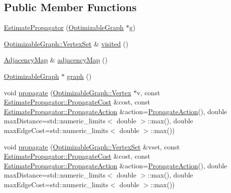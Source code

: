 \subsection*{Public Member Functions}
\begin{DoxyCompactItemize}
\item 
\hyperlink{classg2o_1_1EstimatePropagator_af245037ba41bfb02d531c11f5de4f7e8}{Estimate\+Propagator} (\hyperlink{structg2o_1_1OptimizableGraph}{Optimizable\+Graph} $\ast$g)
\item 
\hyperlink{classg2o_1_1HyperGraph_a703938cdb4bb636860eed55a2489d70c}{Optimizable\+Graph\+::\+Vertex\+Set} \& \hyperlink{classg2o_1_1EstimatePropagator_a2d346a2411d969caa81817c15052cd58}{visited} ()
\item 
\hyperlink{classg2o_1_1EstimatePropagator_aa450038ec206c089ecf023cb88cb2847}{Adjacency\+Map} \& \hyperlink{classg2o_1_1EstimatePropagator_ad6dc3d18c4057915af4cc4986b568855}{adjacency\+Map} ()
\item 
\hyperlink{structg2o_1_1OptimizableGraph}{Optimizable\+Graph} $\ast$ \hyperlink{classg2o_1_1EstimatePropagator_a97064a86789b496b590f4848fdb59bc8}{graph} ()
\item 
void \hyperlink{classg2o_1_1EstimatePropagator_a3b1df65f9b89d81dff33cb140d4f75d4}{propagate} (\hyperlink{classg2o_1_1OptimizableGraph_1_1Vertex}{Optimizable\+Graph\+::\+Vertex} $\ast$v, const \hyperlink{classg2o_1_1EstimatePropagator_a67a42f9c6d5f92562ac4ea12f81c8d9c}{Estimate\+Propagator\+::\+Propagate\+Cost} \&cost, const \hyperlink{structg2o_1_1EstimatePropagator_1_1PropagateAction}{Estimate\+Propagator\+::\+Propagate\+Action} \&action=\hyperlink{structg2o_1_1EstimatePropagator_1_1PropagateAction}{Propagate\+Action}(), double max\+Distance=std\+::numeric\+\_\+limits$<$ double $>$\+::max(), double max\+Edge\+Cost=std\+::numeric\+\_\+limits$<$ double $>$\+::max())
\item 
void \hyperlink{classg2o_1_1EstimatePropagator_ae24b104ec3e8162bc75a70db9941f342}{propagate} (\hyperlink{classg2o_1_1HyperGraph_a703938cdb4bb636860eed55a2489d70c}{Optimizable\+Graph\+::\+Vertex\+Set} \&vset, const \hyperlink{classg2o_1_1EstimatePropagator_a67a42f9c6d5f92562ac4ea12f81c8d9c}{Estimate\+Propagator\+::\+Propagate\+Cost} \&cost, const \hyperlink{structg2o_1_1EstimatePropagator_1_1PropagateAction}{Estimate\+Propagator\+::\+Propagate\+Action} \&action=\hyperlink{structg2o_1_1EstimatePropagator_1_1PropagateAction}{Propagate\+Action}(), double max\+Distance=std\+::numeric\+\_\+limits$<$ double $>$\+::max(), double max\+Edge\+Cost=std\+::numeric\+\_\+limits$<$ double $>$\+::max())
\end{DoxyCompactItemize}
